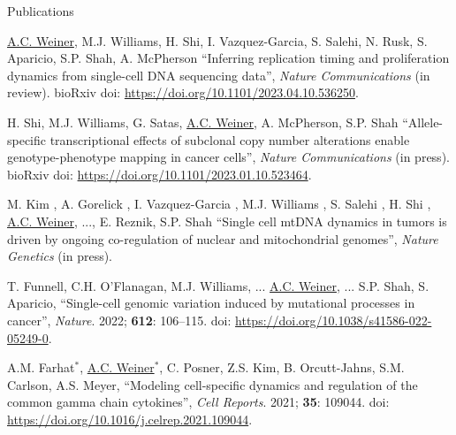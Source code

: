 \documentclass{resume} %
\begin{document}
\begin{rSection}{Publications}

\underline{A.C. Weiner}, M.J. Williams, H. Shi, I. Vazquez-Garcia, S. Salehi, N. Rusk, S. Aparicio, S.P. Shah, A. McPherson ``Inferring replication timing and proliferation dynamics from single-cell DNA sequencing data'', \textit{Nature Communications} (in review). bioRxiv doi: \url{https://doi.org/10.1101/2023.04.10.536250}.

H. Shi, M.J. Williams, G. Satas, \underline{A.C. Weiner}, A. McPherson, S.P. Shah ``Allele-specific transcriptional effects of subclonal copy number alterations enable genotype-phenotype mapping in cancer cells'', \textit{Nature Communications} (in press). bioRxiv doi: \url{https://doi.org/10.1101/2023.01.10.523464}.

M. Kim , A. Gorelick , I. Vazquez-Garcia , M.J. Williams , S. Salehi , H. Shi , \underline{A.C. Weiner}, ..., E. Reznik, S.P. Shah ``Single cell mtDNA dynamics in tumors is driven by ongoing co-regulation of nuclear and mitochondrial genomes'', \textit{Nature Genetics} (in press).

T. Funnell, C.H. O’Flanagan, M.J. Williams, ... \underline{A.C. Weiner}, ... S.P. Shah, S. Aparicio, ``Single-cell genomic variation induced by mutational processes in cancer'', \textit{Nature}. 2022; \textbf{612}: 106–115. doi: \url{https://doi.org/10.1038/s41586-022-05249-0}.


A.M. Farhat$^{\ast}$, \underline{A.C. Weiner}$^{\ast}$, C. Posner, Z.S. Kim, B. Orcutt-Jahns, S.M. Carlson, A.S. Meyer, ``Modeling cell-specific dynamics and regulation of the common gamma chain cytokines'', \textit{Cell Reports}. 2021; \textbf{35}: 109044. doi: \url{https://doi.org/10.1016/j.celrep.2021.109044}.


\end{rSection}

\end{document}
